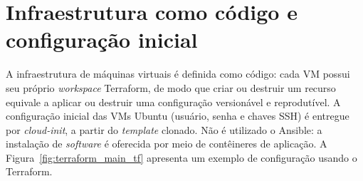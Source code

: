 \section{Infraestrutura como código e configuração inicial}

A infraestrutura de máquinas virtuais é definida como código: cada VM possui seu próprio \textit{workspace} Terraform, de modo que criar ou destruir um recurso equivale a aplicar ou destruir uma configuração versionável e reprodutível. A configuração inicial das VMs Ubuntu (usuário, senha e chaves SSH) é entregue por \textit{cloud-init}, a partir do \textit{template} clonado. Não é utilizado o Ansible: a instalação de \textit{software} é oferecida por meio de contêineres de aplicação. A Figura~\ref{fig:terraform_main_tf} apresenta um exemplo de configuração usando o Terraform.

